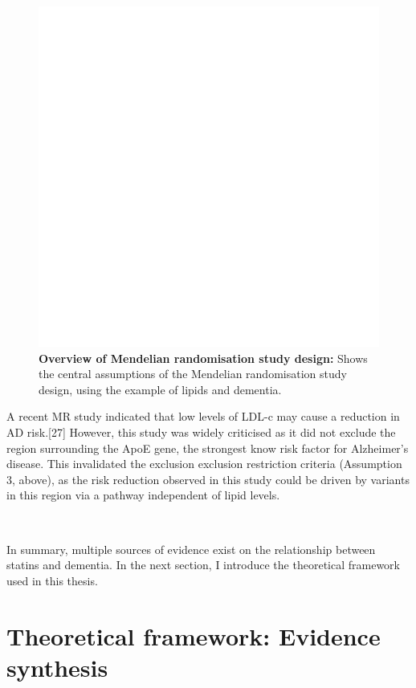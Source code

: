 \documentclass[a4paper, twoside]{templates/ociamthesis}
\begin{document}
\begin{figure}
\includegraphics[width=1\linewidth]{figures/sys-rev/prismaflow} \caption[Overview of Mendelian randomisation study design]{\textbf{Overview of Mendelian randomisation study design:} Shows the central assumptions of the Mendelian randomisation study design, using the example of lipids and dementia.}\label{fig:mr-overview}
\end{figure}

A recent MR study indicated that low levels of LDL-c may cause a reduction in AD risk.{[}27{]} However, this study was widely criticised as it did not exclude the region surrounding the ApoE gene, the strongest know risk factor for Alzheimer's disease. This invalidated the exclusion exclusion restriction criteria (Assumption 3, above), as the risk reduction observed in this study could be driven by variants in this region via a pathway independent of lipid levels.

~

In summary, multiple sources of evidence exist on the relationship between statins and dementia. In the next section, I introduce the theoretical framework used in this thesis.

\hypertarget{theoretical-framework-evidence-synthesis}{%
\section{Theoretical framework: Evidence synthesis}\label{theoretical-framework-evidence-synthesis}}
\end{document}
